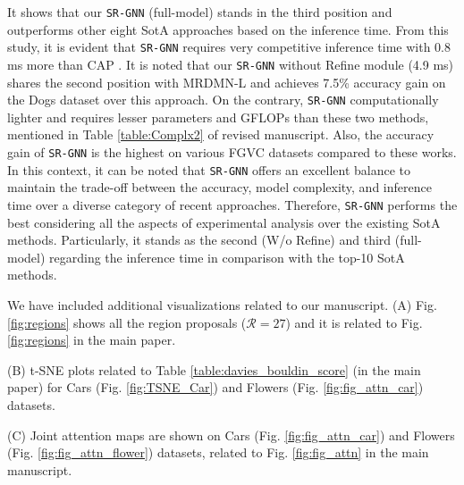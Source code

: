 \documentclass[journal]{IEEEtran}
\begin{document}
It shows that our \texttt{SR-GNN} (full-model) stands in the third position and outperforms other eight SotA approaches based on the inference time. From this study, it is evident that \texttt{SR-GNN} requires very competitive inference time with 0.8 ms more than CAP \cite{behera2021context}. It is noted that our \texttt{SR-GNN} without Refine module (4.9 ms) shares the second position with MRDMN-L \cite{xu2021multiresolution} and achieves 7.5\% accuracy gain on the Dogs dataset over this approach. On the contrary, \texttt{SR-GNN} computationally lighter and requires lesser parameters and GFLOPs than these two methods, mentioned in Table \ref{table:Complx2}  of revised manuscript. Also, the accuracy gain of \texttt{SR-GNN} is the highest on various FGVC datasets compared to these works. In this context, it can be noted that \texttt{SR-GNN} offers an excellent balance to maintain the trade-off between the accuracy, model complexity, and inference time over a diverse category of recent approaches. Therefore, \texttt{SR-GNN} performs the best considering all the aspects of experimental analysis over the existing SotA methods. Particularly, it stands as the second (W/o Refine) and third (full-model) regarding the inference time in comparison with the top-10 SotA methods.   

We have included additional visualizations related to our manuscript. 
(A) Fig. \ref{fig:regions} shows all the region proposals ($\mathcal{R}=27$) and it is related to Fig. \ref{fig:regions} in the main paper.

(B)  t-SNE plots related to Table \ref{table:davies_bouldin_score} (in the main paper) for Cars (Fig. \ref{fig:TSNE_Car}) and Flowers (Fig. \ref{fig:fig_attn_car}) datasets.

(C) Joint attention maps are shown on Cars (Fig. \ref{fig:fig_attn_car}) and Flowers (Fig. \ref{fig:fig_attn_flower}) datasets, related to Fig.   \ref{fig:fig_attn} in the main manuscript. \\
\end{document}
